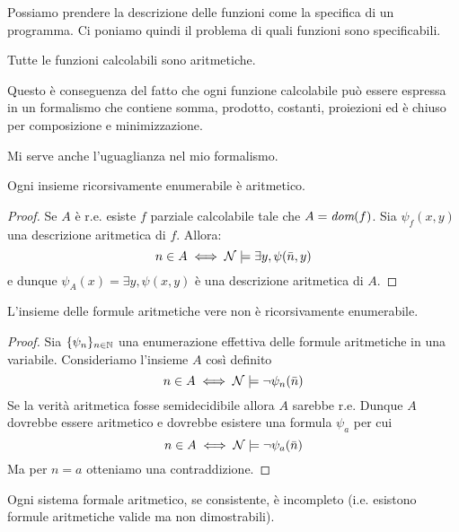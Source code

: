 Possiamo prendere la descrizione delle funzioni come la specifica di un programma. Ci poniamo quindi
il problema di quali funzioni sono specificabili.

\begin{thm}
    Tutte le funzioni calcolabili sono aritmetiche.    
\end{thm}

Questo è conseguenza del fatto che ogni funzione calcolabile può essere espressa in un formalismo che
contiene somma, prodotto, costanti, proiezioni ed è chiuso per composizione e minimizzazione.

Mi serve anche l'uguaglianza nel mio formalismo.

\begin{thm}
    Ogni insieme ricorsivamente enumerabile è aritmetico.
\end{thm}
\begin{proof}
    Se $A$ è r.e. esiste $f$ parziale calcolabile tale che $A = \textit{dom}(f)$. Sia $\psi_{f}(x,y)$ una
    descrizione aritmetica di $f$. Allora:
    \begin{equation*}
        n \in A \iff \mathcal{N} \models \exists y, \psi(\bar{n},y)
    \end{equation*}
    e dunque $\psi_{A}(x) = \exists y, \psi(x,y)$ è una descrizione aritmetica di $A$.
\end{proof}

\begin{thm}
    L'insieme delle formule aritmetiche vere non è ricorsivamente enumerabile.
\end{thm}
\begin{proof}
    Sia $\{\psi_{n}\}_{n \in \mathbb{N}}$ una enumerazione effettiva delle formule aritmetiche in una
    variabile. Consideriamo l'insieme $A$ così definito
    \begin{equation*}
        n \in A \iff \mathcal{N} \models \lnot \psi_{n}(\bar{n})
    \end{equation*}
    Se la verità aritmetica fosse semidecidibile allora $A$ sarebbe r.e. Dunque $A$ dovrebbe essere
    aritmetico e dovrebbe esistere una formula $\psi_{a}$ per cui
    \begin{equation*}
        n \in A \iff \mathcal{N} \models \lnot \psi_{a}(\bar{n})
    \end{equation*}
    Ma per $n=a$ otteniamo una contraddizione.
\end{proof}

\begin{thm}
    Ogni sistema formale aritmetico, se consistente, è incompleto (i.e. esistono formule
    aritmetiche valide ma non dimostrabili).
\end{thm}

